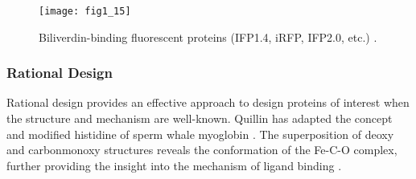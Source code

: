 \begin{refsection}
\begin{figure}[h!] \centering \texttt{[image: fig1\_15]}
    \caption[Biliverdin-binding fluorescent proteins (IFP1.4, iRFP, IFP2.0,
    etc.).]{Biliverdin-binding fluorescent proteins (IFP1.4, iRFP, IFP2.0,
        etc.) \cite{Kazlauskas2005}.} \label{fig:protein-engineering-example} 
\end{figure}

\subsubsection{Rational Design}
\label{sec:rational-design}

Rational design provides an effective approach to design proteins of interest
when the structure and mechanism are well-known. Quillin  has adapted
the concept and modified histidine of sperm whale myoglobin \cite{Quillin1993}.
The superposition of deoxy and carbonmonoxy structures reveals  the
conformation of the Fe-C-O complex, further providing the insight into the
mechanism of ligand binding \cite{Quillin1993}. 


\end{refsection}
